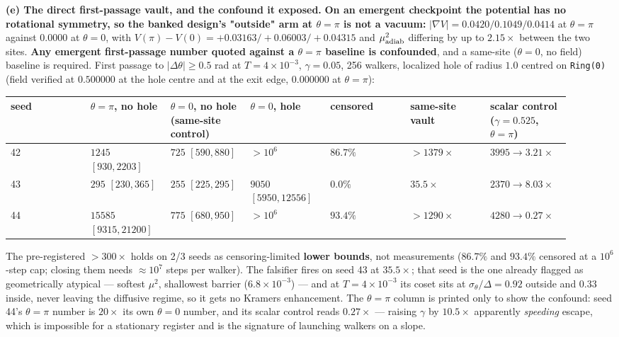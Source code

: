 \documentclass{article}
\begin{document}
\textbf{(e) The direct first-passage vault, and the confound it exposed.} \textbf{On an emergent checkpoint the potential has no rotational symmetry, so the banked design's "outside" arm at $\theta=\pi$ is not a vacuum:} $|\nabla V|=0.0420/0.1049/0.0414$ at $\theta=\pi$ against $0.0000$ at $\theta=0$, with $V(\pi)-V(0)=+0.03163/+0.06003/+0.04315$ and $\mu^2_{\rm adiab}$ differing by up to $2.15\times$ between the two sites. \textbf{Any emergent first-passage number quoted against a $\theta=\pi$ baseline is confounded}, and a same-site ($\theta=0$, no field) baseline is required. First passage to $|\Delta\theta|\ge0.5$ rad at $T=4\times10^{-3}$, $\gamma=0.05$, 256 walkers, localized hole of radius $1.0$ centred on \texttt{Ring(0)} (field verified at $0.500000$ at the hole centre and at the exit edge, $0.000000$ at $\theta=\pi$):

\begin{table}[t]\centering\small
\begin{tabular}{p{0.131\linewidth}p{0.131\linewidth}p{0.131\linewidth}p{0.131\linewidth}p{0.131\linewidth}p{0.131\linewidth}p{0.131\linewidth}}
\toprule
seed & $\theta=\pi$, no hole & $\theta=0$, no hole (same-site control) & $\theta=0$, hole & censored & same-site vault & scalar control ($\gamma=0.525$, $\theta=\pi$) \\
\midrule
42 & $1245$ $[930,2203]$ & $725$ $[590,880]$ & $>10^6$ & $86.7\%$ & $>1379\times$ & $3995\to3.21\times$ \\
43 & $295$ $[230,365]$ & $255$ $[225,295]$ & $9050$ $[5950,12556]$ & $0.0\%$ & $35.5\times$ & $2370\to8.03\times$ \\
44 & $15585$ $[9315,21200]$ & $775$ $[680,950]$ & $>10^6$ & $93.4\%$ & $>1290\times$ & $4280\to0.27\times$ \\
\bottomrule
\end{tabular}
\end{table}

The pre-registered $>300\times$ holds on 2/3 seeds as censoring-limited \textbf{lower bounds}, not measurements ($86.7\%$ and $93.4\%$ censored at a $10^6$-step cap; closing them needs $\approx10^7$ steps per walker). The falsifier fires on seed 43 at $35.5\times$; that seed is the one already flagged as geometrically atypical --- softest $\mu^2$, shallowest barrier ($6.8\times10^{-3}$) --- and at $T=4\times10^{-3}$ its coset sits at $\sigma_\theta/\Delta=0.92$ outside and $0.33$ inside, never leaving the diffusive regime, so it gets no Kramers enhancement. The $\theta=\pi$ column is printed only to show the confound: seed 44's $\theta=\pi$ number is $20\times$ its own $\theta=0$ number, and its scalar control reads $0.27\times$ --- raising $\gamma$ by $10.5\times$ apparently \emph{speeding} escape, which is impossible for a stationary register and is the signature of launching walkers on a slope.
\end{document}
